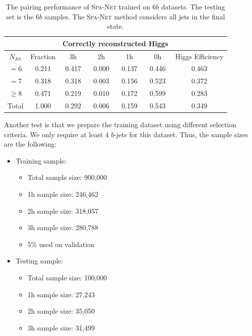 \documentclass[12pt]{article}
\begin{document}
    \begin{table}[htpb]
		\centering
        \caption{The pairing performance of \textsc{Spa-Net} trained on $6b$ datasets. The testing set is the $6b$ samples. The \textsc{Spa-Net} method considers all jets in the final state.}
		\label{tab:resonant_6b_SPANet_pairing_6b_region}
		\begin{tabular}{c|c|cccc|c}
			\multicolumn{1}{l|}{} &          & \multicolumn{4}{c|}{Correctly reconstructed Higgs} & \multicolumn{1}{l}{} \\ \hline
			$N_\text{Jet}$        & Fraction & 3h          & 2h         & 1h         & 0h         & Higgs Efficiency     \\ \hline
			$=6$                  & 0.211 & 0.417 & 0.000 & 0.137 & 0.446 & 0.463                \\
			$=7$                  & 0.318 & 0.318 & 0.003 & 0.156 & 0.523 & 0.372                \\
			$\ge 8$               & 0.471 & 0.219 & 0.010 & 0.172 & 0.599 & 0.283                \\ \hline
			Total                 & 1.000 & 0.292 & 0.006 & 0.159 & 0.543 & 0.349               
		\end{tabular}
	\end{table}

    Another test is that we prepare the training dataset using different selection criteria. We only require at least 4 $b$-jets for this dataset. Thus, the sample sizes are the following:
    \begin{itemize}
        \item Training sample:
        \begin{itemize}
            \item Total sample size: 900,000
            \item 1h sample size: 246,462
            \item 2h sample size: 318,057
            \item 3h sample size: 280,788
            \item 5\% used on validation
        \end{itemize}
        \item Testing sample:
        \begin{itemize}
            \item Total sample size: 100,000
            \item 1h sample size: 27,243
            \item 2h sample size: 35,050
            \item 3h sample size: 31,499
        \end{itemize}
    \end{itemize}
\end{document}
